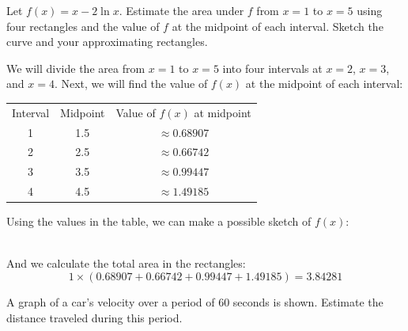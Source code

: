 \begin{Exercise}[label=rsum3]
	Let $f(x) = x-2\ln{x}$. Estimate the area under $f$ from $x=1$ to $x=5$ using four rectangles and the value of $f$ at the midpoint of each interval. Sketch the curve and your approximating rectangles.
\end{Exercise}

\begin{Answer}[ref=rsum3]
	We will divide the area from $x=1$ to $x=5$ into four intervals at $x=2$, $x=3$, and $x=4$. Next, we will find the value of $f(x)$ at the midpoint of each interval:
	\begin{center}
		\begin{tabular}{c|c|c}
			Interval & Midpoint & Value of $f(x)$ at midpoint \\
			1        & 1.5      & $\approx0.68907$            \\
			2        & 2.5      & $\approx0.66742$            \\
			3        & 3.5      & $\approx0.99447$            \\
			4        & 4.5      & $\approx1.49185$            \\
		\end{tabular}
	\end{center}

	Using the values in the table, we can make a possible sketch of $f(x)$:\\
	\\
	And we calculate the total area in the rectangles:
	$$1\times(0.68907+0.66742+0.99447+1.49185)=3.84281$$
\end{Answer}

\begin{Exercise}[label=rsum4]
	A graph of a car's velocity over a period of 60 seconds is shown. Estimate the distance traveled during this period.
\end{Exercise}

